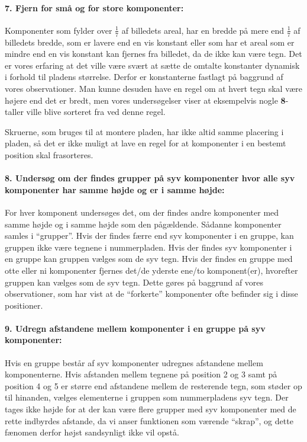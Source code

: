 \paragraph{7. Fjern for små og for store komponenter:} Komponenter som fylder over $\frac{1}{7}$ af billedets areal, har en bredde på mere end $\frac{1}{7}$ af billedets bredde, som er lavere end en vis konstant eller som har et areal som er mindre end en vis konstant kan fjernes fra billedet, da de ikke kan være tegn. Det er vores erfaring at det ville være svært at sætte de omtalte konstanter dynamisk i forhold til pladens størrelse. Derfor er konstanterne fastlagt på baggrund af vores observationer. Man kunne desuden have en regel om at hvert tegn skal være højere end det er bredt, men vores undersøgelser viser at eksempelvis nogle \textbf{8}-taller ville blive sorteret fra ved denne regel.

Skruerne, som bruges til at montere pladen, har ikke altid samme placering i pladen, så det er ikke muligt at lave en regel for at komponenter i en bestemt position skal frasorteres.

\paragraph{8. Undersøg om der findes grupper på syv komponenter hvor alle syv komponenter har samme højde og er i samme højde:} For hver komponent undersøges det, om der findes andre komponenter med samme højde og i samme højde som den pågældende. Sådanne komponenter samles i ``grupper''. Hvis der findes færre end syv komponenter i en gruppe, kan gruppen ikke være tegnene i nummerpladen. Hvis der findes syv komponenter i en gruppe kan gruppen vælges som de syv tegn. Hvis der findes en gruppe med otte eller ni komponenter fjernes det/de yderste ene/to komponent(er), hvorefter gruppen kan vælges som de syv tegn. Dette gøres på baggrund af vores observationer, som har vist at de ``forkerte'' komponenter ofte befinder sig i disse positioner.

\paragraph{9. Udregn afstandene mellem komponenter i en gruppe på syv komponenter:} Hvis en gruppe består af syv komponenter udregnes afstandene mellem komponenterne. Hvis afstanden mellem tegnene på position 2 og 3 samt på position 4 og 5 er større end afstandene mellem de resterende tegn, som støder op til hinanden, vælges elementerne i gruppen som nummerpladens syv tegn. Der tages ikke højde for at der kan være flere grupper med syv komponenter med de rette indbyrdes afstande, da vi anser funktionen som værende ``skrap'', og dette fænomen derfor højst sandsynligt ikke vil opstå.

